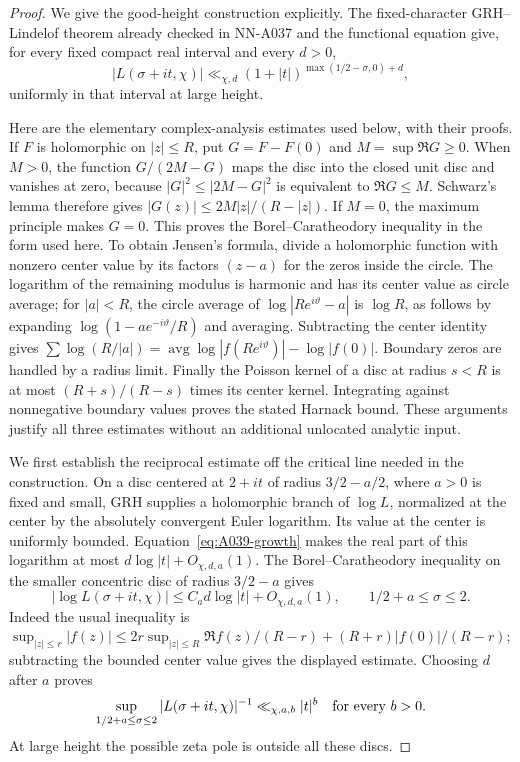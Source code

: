 \begin{proof}
We give the good-height construction explicitly. The fixed-character
GRH--Lindelof theorem already checked in NN-A037 and the functional
equation give, for every fixed compact real interval and every $d>0$,
\begin{equation}\label{eq:A039-growth}
 |L(\sigma+it,\chi)|\ll_{\chi,d}
           (1+|t|)^{\max(1/2-\sigma,0)+d},
\end{equation}
uniformly in that interval at large height.

Here are the elementary complex-analysis estimates used below, with
their proofs. If $F$ is holomorphic on $|z|\le R$, put
$G=F-F(0)$ and $M=\sup\Re G\ge0$. When $M>0$, the function
$G/(2M-G)$ maps the disc into the closed unit disc and vanishes at
zero, because $|G|^2\le|2M-G|^2$ is equivalent to $\Re G\le M$.
Schwarz's lemma therefore gives
$|G(z)|\le2M|z|/(R-|z|)$. If $M=0$, the maximum principle
makes $G=0$. This proves the Borel--Caratheodory inequality in
the form used here. To obtain Jensen's formula, divide a holomorphic
function with nonzero center value by its factors $(z-a)$ for the
zeros inside the circle. The logarithm of the remaining modulus is
harmonic and has its center value as circle average; for $|a|<R$,
the circle average of $\log|Re^{i\vartheta}-a|$ is $\log R$, as
follows by expanding $\log(1-ae^{-i\vartheta}/R)$ and averaging.
Subtracting the center identity gives
$\sum\log(R/|a|)=\operatorname{avg}\log|f(Re^{i\vartheta})|
-\log|f(0)|$. Boundary zeros are handled by a radius limit.
Finally the Poisson kernel of a disc at radius $s<R$ is at most
$(R+s)/(R-s)$ times its center kernel. Integrating against
nonnegative boundary values proves the stated Harnack bound.
These arguments justify all three estimates without an additional
unlocated analytic input.

We first establish the reciprocal estimate off the critical line
needed in the construction. On a disc centered at $2+it$ of radius
$3/2-a/2$, where $a>0$ is fixed and small, GRH supplies a holomorphic
branch of $\log L$, normalized at the center by the absolutely
convergent Euler logarithm. Its value at the center is uniformly
bounded. Equation~\eqref{eq:A039-growth} makes the real part of this
logarithm at most $d\log|t|+O_{\chi,d,a}(1)$. The
Borel--Caratheodory inequality on the smaller concentric disc of
radius $3/2-a$ gives
\[
 |\log L(\sigma+it,\chi)|
       \le C_a d\log|t|+O_{\chi,d,a}(1),
                 \qquad 1/2+a\le\sigma\le2.
\]
Indeed the usual inequality is
$\sup_{|z|\le r}|f(z)|\le
2r\sup_{|z|\le R}\Re f(z)/(R-r)
+(R+r)|f(0)|/(R-r)$; subtracting the bounded center value
gives the displayed estimate. Choosing $d$ after $a$ proves
\begin{equation}\label{eq:A039-away-inverse}
 \sup_{1/2+a\le\sigma\le2}|L(\sigma+it,\chi)|^{-1}
                      \ll_{\chi,a,b}|t|^b
 \quad\hbox{for every }b>0.
\end{equation}
At large height the possible zeta pole is outside all these discs.


\end{proof}

